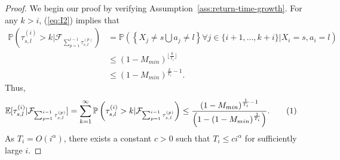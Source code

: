 \documentclass[twoside,11pt]{article}
\newcommand{\pow}[1]{^{(#1)}}%
\numberwithin{equation}{section}
\newcommand{\lp}{\left(}
\newcommand{\rp}{\right)}
\newcommand{\lc}{\left\{}
\newcommand{\rc}{\right\}}
\newcommand{\Pbb}{\mathbb{P}}
\newcommand{\Fcal}{\mathcal{F}}
\newcommand\numberthis{\addtocounter{equation}{1}\tag{\theequation}}
\newcommand{\prob}{\Pbb}
\newcommand{\expec}{\mathbb{E}}
\begin{document}
\begin{proof}
We begin our proof by verifying Assumption~\ref{ass:return-time-growth}.
For any $k>i$, (\ref{eq:I2}) implies that
    \begin{align*}
    \prob\lp \tau_{s,l}\pow{i}>k | \Fcal_{\sum_{p=1}^{i-1} \tau_{s,l}\pow{p}} \rp  & =\prob\lp \lc X_j\neq s\bigcup a_j\neq l \rc \forall j\in\{i+1,\dots,k+i\}|X_i=s,a_i=l \rp\\
    & \leq \lp1-M_{min}\rp^{\lfloor\frac{k}{T_i}\rfloor}\\
    & \leq \lp1-M_{min}\rp^{\frac{k}{T_i}-1}.
\end{align*}
Thus, 
\begin{align*}
    \expec[\tau_{s,l} \pow i | \Fcal_{\sum_{p=1}^{i-1}\tau_{s,l}\pow{p}} ]=\sum_{k=1}^\infty \prob\lp\tau_{s,l}^{(i)}>k |\Fcal_{\sum_{p=1}^{i-1} \tau_{s,l}\pow{p}}\rp&\leq \frac{\lp1-M_{min}\rp^{\frac{1}{T_i}-1}}{\lp 1-\lp1-M_{min}\rp^{\frac{1}{T_i}}\rp}. \numberthis\label{eq:inhomogenous-eq3}
\end{align*}
As $T_i = O(i^\alpha)$, there exists a constant $c>0$ such that $T_i \leq c i^\alpha$ for sufficiently large $i$.


\end{proof}
\end{document}

